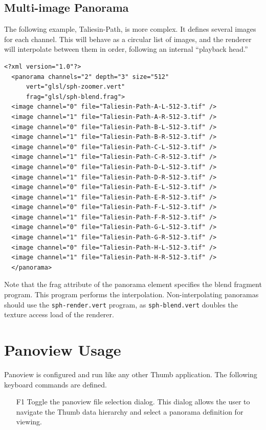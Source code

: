 \documentclass[oneside,11pt]{memoir}
\begin{document}
\begin{Spacing}{1.1}
\subsection{Multi-image Panorama}

The following example, Taliesin-Path, is more complex. It defines several images for each channel. This will behave as a circular list of images, and the renderer will interpolate between them in order, following an internal “playback head.”

\begin{verbatim}
<?xml version="1.0"?>
  <panorama channels="2" depth="3" size="512"
      vert="glsl/sph-zoomer.vert"
      frag="glsl/sph-blend.frag">
  <image channel="0" file="Taliesin-Path-A-L-512-3.tif" />
  <image channel="1" file="Taliesin-Path-A-R-512-3.tif" />
  <image channel="0" file="Taliesin-Path-B-L-512-3.tif" />
  <image channel="1" file="Taliesin-Path-B-R-512-3.tif" />
  <image channel="0" file="Taliesin-Path-C-L-512-3.tif" />
  <image channel="1" file="Taliesin-Path-C-R-512-3.tif" />
  <image channel="0" file="Taliesin-Path-D-L-512-3.tif" />
  <image channel="1" file="Taliesin-Path-D-R-512-3.tif" />
  <image channel="0" file="Taliesin-Path-E-L-512-3.tif" />
  <image channel="1" file="Taliesin-Path-E-R-512-3.tif" />
  <image channel="0" file="Taliesin-Path-F-L-512-3.tif" />
  <image channel="1" file="Taliesin-Path-F-R-512-3.tif" />
  <image channel="0" file="Taliesin-Path-G-L-512-3.tif" />
  <image channel="1" file="Taliesin-Path-G-R-512-3.tif" />
  <image channel="0" file="Taliesin-Path-H-L-512-3.tif" />
  <image channel="1" file="Taliesin-Path-H-R-512-3.tif" />
  </panorama>
\end{verbatim}

Note that the frag attribute of the panorama element specifies the blend fragment program. This program performs the interpolation. Non-interpolating panoramas should use the \texttt{sph-render.vert} program, as \texttt{sph-blend.vert} doubles the texture access load of the renderer.

\section{Panoview Usage}

Panoview is configured and run like any other Thumb application. The following keyboard commands are defined.

\begin{itemize}
\item[F1] Toggle the panoview file selection dialog. This dialog allows the user to navigate the Thumb data hierarchy and select a panorama definition for viewing.


\end{itemize}
\end{Spacing}
\end{document}
